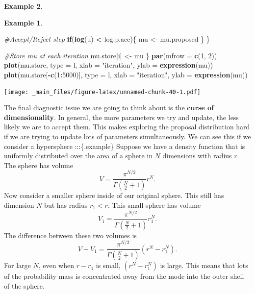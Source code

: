 \documentclass[
]{book}
\newenvironment{Shaded}{\begin{snugshade}}{\end{snugshade}}
\newcommand{\AttributeTok}[1]{\textcolor[rgb]{0.13,0.29,0.53}{#1}}
\newcommand{\CommentTok}[1]{\textcolor[rgb]{0.56,0.35,0.01}{\textit{#1}}}
\newcommand{\ControlFlowTok}[1]{\textcolor[rgb]{0.13,0.29,0.53}{\textbf{#1}}}
\newcommand{\DecValTok}[1]{\textcolor[rgb]{0.00,0.00,0.81}{#1}}
\newcommand{\FunctionTok}[1]{\textcolor[rgb]{0.13,0.29,0.53}{\textbf{#1}}}
\newcommand{\NormalTok}[1]{#1}
\newcommand{\OtherTok}[1]{\textcolor[rgb]{0.56,0.35,0.01}{#1}}
\newcommand{\SpecialCharTok}[1]{\textcolor[rgb]{0.81,0.36,0.00}{\textbf{#1}}}
\newcommand{\StringTok}[1]{\textcolor[rgb]{0.31,0.60,0.02}{#1}}
\theoremstyle{definition}
\theoremstyle{definition}
\newtheorem{example}{Example}[chapter]
\theoremstyle{definition}
\theoremstyle{definition}
\theoremstyle{remark}
\begin{document}
\begin{example}
\begin{example}
\begin{Shaded}
\begin{Highlighting}[]
    \CommentTok{\#Accept/Reject step}
    \ControlFlowTok{if}\NormalTok{(}\FunctionTok{log}\NormalTok{(u) }\SpecialCharTok{\textless{}}\NormalTok{ log.p.acc)\{}
\NormalTok{      mu }\OtherTok{\textless{}{-}}\NormalTok{ mu.proposed}
\NormalTok{    \}}
\NormalTok{  \}}
  
  \CommentTok{\#Store mu at each iteration}
\NormalTok{  mu.store[i] }\OtherTok{\textless{}{-}}\NormalTok{ mu}
\NormalTok{\}}
\FunctionTok{par}\NormalTok{(}\AttributeTok{mfrow =} \FunctionTok{c}\NormalTok{(}\DecValTok{1}\NormalTok{, }\DecValTok{2}\NormalTok{))}
\FunctionTok{plot}\NormalTok{(mu.store, }\AttributeTok{type =} \StringTok{\textquotesingle{}l\textquotesingle{}}\NormalTok{, }\AttributeTok{xlab =} \StringTok{"iteration"}\NormalTok{, }\AttributeTok{ylab =} \FunctionTok{expression}\NormalTok{(mu))}
\FunctionTok{plot}\NormalTok{(mu.store[}\SpecialCharTok{{-}}\FunctionTok{c}\NormalTok{(}\DecValTok{1}\SpecialCharTok{:}\DecValTok{5000}\NormalTok{)], }\AttributeTok{type =} \StringTok{\textquotesingle{}l\textquotesingle{}}\NormalTok{, }\AttributeTok{xlab =} \StringTok{"iteration"}\NormalTok{,}
     \AttributeTok{ylab =} \FunctionTok{expression}\NormalTok{(mu))}
\end{Highlighting}
\end{Shaded}

\texttt{[image: \_main\_files/figure-latex/unnamed-chunk-40-1.pdf]}
\end{example}

The final diagnostic issue we are going to think about is the \textbf{curse of dimensionality}. In general, the more parameters we try and update, the less likely we are to accept them. This makes exploring the proposal distribution hard if we are trying to update lots of parameters simultaneously. We can see this if we consider a hypersphere
:::\{.example\}
Suppose we have a density function that is uniformly distributed over the area of a sphere in \(N\) dimensions with radius \(r\). The sphere has volume
\[
V = \frac{\pi^{N/2}}{\Gamma(\frac{N}{2} + 1)}r^N.
\]
Now consider a smaller sphere inside of our original sphere. This still has dimension \(N\) but has radius \(r_1 < r\). This small sphere has volume
\[
V_1 = \frac{\pi^{N/2}}{\Gamma(\frac{N}{2} + 1)}r_1^N.
\]
The difference between these two volumes is
\[
V - V_1 = \frac{\pi^{N/2}}{\Gamma(\frac{N}{2} + 1)}(r^N - r_1^N).
\]
For large \(N\), even when \(r - r_1\) is small, \((r^N - r_1^N)\) is large. This means that lots of the probability mass is concentrated away from the mode into the outer shell of the sphere.
\end{example}
\end{document}
